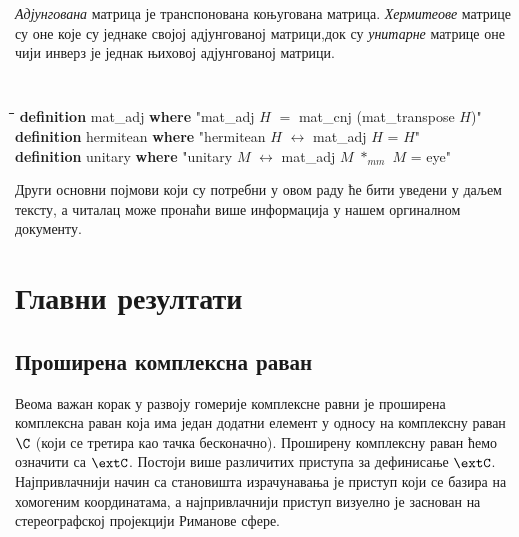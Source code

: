 \emph{Адјунгована} матрица је транспонована коњугована
матрица. \emph{Хермитеове} матрице су оне које су једнаке својој
адјунгованој матрици,док су \emph{унитарне} матрице оне чији инверз је
једнак њиховој адјунгованој матрици.
{\tt
\begin{tabbing}
\hspace{5mm}\=\hspace{5mm}\=\hspace{5mm}\=\hspace{5mm}\=\hspace{5mm}\=\kill
{\bf definition} mat\_adj {\bf where} "mat\_adj $H$ $=$ mat\_cnj (mat\_transpose $H$)"\\
{\bf definition} hermitean {\bf where} "hermitean $H$ $\longleftrightarrow$ mat\_adj $H$ = $H$"\\
{\bf definition} unitary {\bf where} "unitary $M$ $\longleftrightarrow$ mat\_adj $M$ $*_{mm}$  $M$ = eye"
\end{tabbing}
}

Други основни појмови који су потребни у овом раду ће бити уведени у
даљем тексту, а читалац може пронаћи више информација у нашем
оргиналном документу.


\section{Главни резултати}
\label{sec:main}
\subsection{Проширена комплексна раван}
\label{subsec:extc}
Веома важан корак у развоју гомерије комплексне равни је проширена
комплексна раван која има један додатни елемент у односу на комплексну
раван $\C$ (који се третира као тачка бесконачно). Проширену
комплексну раван ћемо означити са $\extC$. Постоји више различитих
приступа \cite{needham,schwerdtfeger} за дефинисање
$\extC$. Најпривлачнији начин са становишта израчунавања је приступ
који се базира на хомогеним координатама, а најпривлачнији приступ
визуелно је заснован на стереографској пројекцији Риманове сфере.


